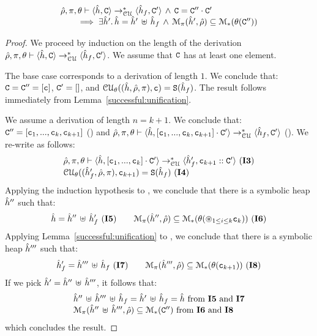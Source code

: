 
\begin{lemma}
\label{lemma:iter:cell:unification}
$$
\begin{array}{l}
  \cellunificationiter{\sheap, \cells}{\sheap_f,  \cells'}{\sstore, \pc, \subst} \, \wedge \, \cells = \cells'' \lstconcat \cells'  \\ 
       \qquad \implies
             \exists \sheap' . \, \sheap = \sheap' \dunion \sheap_f  \, \wedge \, 
		\smodels{\sheap', \sstore}{\pc} \subseteq \sepmodels{\subst(\cells'')}
 \end{array}
$$
\end{lemma}
\begin{proof}
We proceed by induction on the length of the derivation
$\cellunificationiter{\sheap, \cells}{\sheap_f,  \cells'}{\sstore, \pc, \subst}$. 
We assume that $\cells$ has at least one element. 
\vspace{6pt}

\noindent{} The base case corresponds to a derivation of length $1$. 
We conclude that: $\cells = \cells'' = [ \cell ]$, $\cells' = []$, and
$\unification{\sheap, \sstore, \pc}{\cell}{\subst} = \uyes{\sheap_f}$. 
The result follows immediately from Lemma~\ref{successful:unification}. 
\vspace{6pt}

\noindent{} We assume a derivation of length $n=k+1$. 
We conclude that: $\cells'' = [ \cell_1, ..., \cell_k, \cell_{k+1} ]$ () and 
$\cellunificationiter{\sheap,  [ \cell_1, ..., \cell_k, \cell_{k+1} ] \lstconcat \cells'}{\sheap_f,  \cells'}{\sstore, \pc, \subst}$ (). 
We re-write  as follows: 
$$
\begin{array}{l}
\cellunificationiter{\sheap,  [ \cell_1, ..., \cell_k ] \lstconcat \cells'}{\sheap_f', \cell_{k+1} \lstcons \cells'}{\sstore, \pc, \subst} \text{ (\ieq{3})}
\\ 
\unification{\sheap_f', \sstore, \pc}{\cell_{k+1}}{\subst} = \uyes{\sheap_f} \text{ (\ieq{4})}
\end{array}
$$
Applying the induction hypothesis to , we conclude that there is a symbolic heap 
$\sheap''$ such that: 
$$
  \sheap = \sheap'' \dunion \sheap_f'  \text{ (\ieq{5})}
  \qquad 
  \smodels{\sheap'', \sstore}{\pc} \subseteq \sepmodels{\subst(\oast_{1 \leq i \leq k} \cell_k)}  \text{ (\ieq{6})}
$$
Applying Lemma~\ref{successful:unification} to , we conclude that 
there is a symbolic heap $\sheap'''$ such that: 
$$
 \sheap_f' = \sheap''' \dunion \sheap_f  \text{ (\ieq{7})}
  \qquad 
  \smodels{\sheap''', \sstore}{\pc} \subseteq \sepmodels{\subst(\cell_{k+1})}  \text{ (\ieq{8})}
$$
If we pick $\sheap' = \sheap'' \dunion \sheap'''$, it follows that: 
$$
\begin{array}{l}
   \sheap'' \dunion \sheap''' \dunion \sheap_f = \sheap' \dunion \sheap_f = \sheap  \text{ from \ieq{5} and \ieq{7}}\\
   \smodels{\sheap'' \dunion \sheap''', \sstore}{\pc} \subseteq \sepmodels{\cells''} \text{ from \ieq{6} and \ieq{8}}
\end{array}
$$
which concludes the result. 		
\end{proof}

